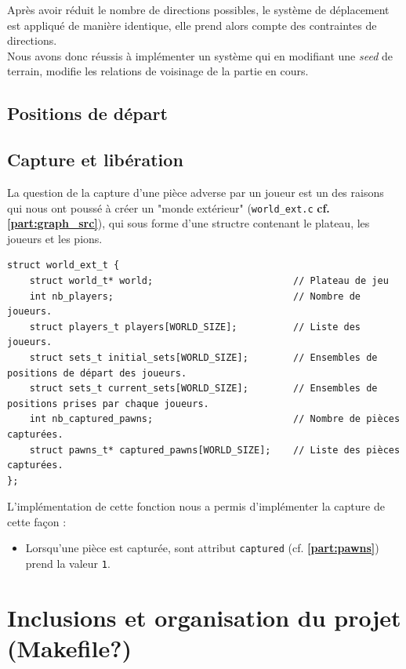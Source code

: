         Après avoir réduit le nombre de directions possibles, le système de déplacement est appliqué de manière identique, elle prend alors compte des contraintes de directions. \\
        Nous avons donc réussis à implémenter un système qui en modifiant une \textit{seed} de terrain, modifie les relations de voisinage de la partie en cours.  
    \subsection{Positions de départ}
    \subsection{Capture et libération}
        La question de la capture d'une pièce adverse par un joueur est un des raisons qui nous ont poussé à créer un "monde extérieur" (\texttt{world\_ext.c} \textbf{cf. \ref{part:graph_src}}), qui sous forme d'une structre contenant le plateau, les joueurs et les pions. \\


        \begin{lstlisting}
struct world_ext_t {
	struct world_t* world;                         // Plateau de jeu
	int nb_players;                                // Nombre de joueurs.
	struct players_t players[WORLD_SIZE];          // Liste des joueurs.
	struct sets_t initial_sets[WORLD_SIZE];        // Ensembles de positions de départ des joueurs.
	struct sets_t current_sets[WORLD_SIZE];        // Ensembles de positions prises par chaque joueurs.
	int nb_captured_pawns;                         // Nombre de pièces capturées.
	struct pawns_t* captured_pawns[WORLD_SIZE];    // Liste des pièces capturées.
};\end{lstlisting}


    L'implémentation de cette fonction nous a permis d'implémenter la capture de cette façon :
    \begin{itemize}
        \item Lorsqu'une pièce est capturée, sont attribut \texttt{captured} (cf. \textbf{\ref{part:pawns}}) prend la valeur \texttt{1}.
    \end{itemize}

\section{Inclusions et organisation du projet (Makefile?)}


